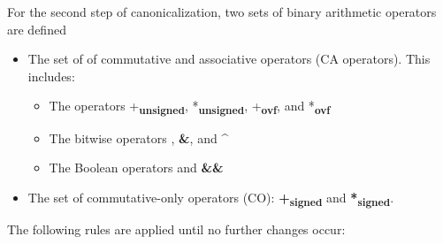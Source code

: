\documentclass[]{article}
\begin{document}
For the second step of canonicalization, two sets of binary arithmetic
operators are defined

\begin{itemize}
\item
  The set of of commutative and associative operators (CA operators).
  This includes:

  \begin{itemize}
  \item
    The operators +\textbf{\textsubscript{unsigned}},
    *\textbf{\textsubscript{unsigned}}, +\textbf{\textsubscript{ovf}},
    and *\textbf{\textsubscript{ovf}}
  \item
    The bitwise operators \textbf{\textbar{}}, \textbf{\&}, and
    \textbf{\^{}}
  \item
    The Boolean operators \textbf{\textbar{}\textbar{}} and
    \textbf{\&\&}
  \end{itemize}
\item
  The set of commutative-only operators (CO):
  \textbf{+\textsubscript{signed}} and \textbf{*\textsubscript{signed}}.
\end{itemize}

The following rules are applied until no further changes occur:
\end{document}
